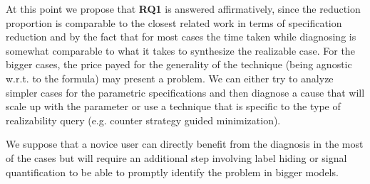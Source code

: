 At this point we propose that \textbf{RQ1} is answered affirmatively, since the reduction proportion is comparable to the closest related work in terms of specification reduction and by the fact that for most cases the time taken while diagnosing is somewhat comparable to what it takes to synthesize the realizable case. For the bigger cases, the price payed for the generality of the technique (being agnostic w.r.t. to the formula) may present a problem. We can either try to analyze simpler cases for the parametric specifications and then diagnose a cause that will scale up with the parameter or use a technique that is specific to the type of realizability query (e.g. counter strategy guided minimization).  

We suppose that a novice user can directly benefit from the diagnosis in the most of the cases but will require an additional step involving label hiding or signal quantification to be able to promptly identify the problem in bigger models.

